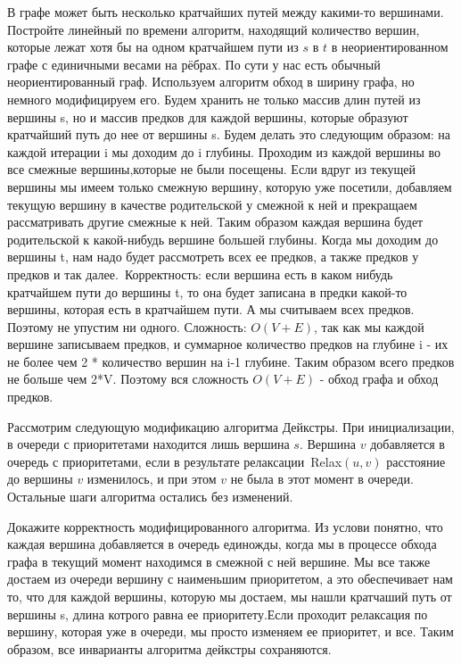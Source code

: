\documentclass[12pt]{extreport}
\theoremstyle{definiton}
\theoremstyle{definition}
\theoremstyle{definition}
\newcounter{problem}
\newcounter{subproblem}
\newcounter{subrproblem}
\def\prsub{\medskip\noindent\stepcounter{subproblem}\setcounter{subrproblem}{0}{\sf \thesubproblem .}\;}
\begin{document}
	
	\Pr[3] В графе может быть несколько кратчайших путей между какими-то вершинами. Постройте линейный по времени алгоритм, находящий количество вершин, которые лежат хотя бы на одном кратчайшем пути из $s$ в $t$ в неориентированном графе с единичными весами на рёбрах.\newline
	По сути у нас есть обычный неориентированный граф. Используем алгоритм обход в ширину графа, но немного модифицируем его. Будем хранить не только массив длин путей из вершины s, но и массив предков для каждой вершины, которые образуют кратчайший путь до нее от вершины s. Будем делать это следующим образом: на каждой итерации i мы доходим до i глубины. Проходим из каждой вершины во все смежные вершины,которые не были посещены. Если вдруг из текущей вершины мы имеем только смежную вершину, которую уже посетили, добавляем текущую вершину в качестве родительской у смежной к ней и прекращаем рассматривать другие смежные к ней. Таким образом каждая вершина будет родительской к какой-нибудь вершине большей глубины. Когда мы доходим до вершины t, нам надо будет рассмотреть всех ее предков, а также предков у предков и так далее.\
	Корректность: если вершина есть в каком нибудь кратчайшем пути до вершины t, то она будет записана в предки какой-то вершины, которая есть в кратчайшем пути. А мы считываем всех предков. Поэтому не упустим ни одного.
	Сложность: $O(V+E)$, так как мы каждой вершине записываем предков, и суммарное количество предков на глубине i - их не более чем 2 * количество вершин на i-1 глубине. Таким образом всего предков не больше чем 2*V. Поэтому вся сложность $O(V+E)$ - обход графа и обход предков. 
	

	\medskip
	
	\Pr[2+2+2] Рассмотрим следующую модификацию алгоритма Дейкстры. При инициализации, в очереди с приоритетами находится лишь вершина $s$. Вершина $v$ добавляется в очередь с приоритетами, если в результате релаксации~Relax$(u,v)$ расстояние до вершины $v$ изменилось, и при этом $v$ не была в этот момент в очереди. Остальные шаги алгоритма остались без изменений.

	\prsub Докажите корректность модифицированного алгоритма.
	\newline
	Из услови понятно, что каждая вершина добавляется в очередь единожды, когда мы в процессе обхода графа в текущий момент находимся в смежной с ней вершине. Мы все также достаем из очереди вершину с наименьшим приоритетом, а это обеспечивает нам то, что для каждой вершины, которую мы достаем, мы нашли кратчаший путь от вершины s, длина котрого равна ее приоритету.Если проходит релаксация по вершину, которая уже в очереди, мы просто изменяем ее приоритет, и все. Таким образом, все инварианты алгоритма дейкстры сохраняются.
\end{document}
